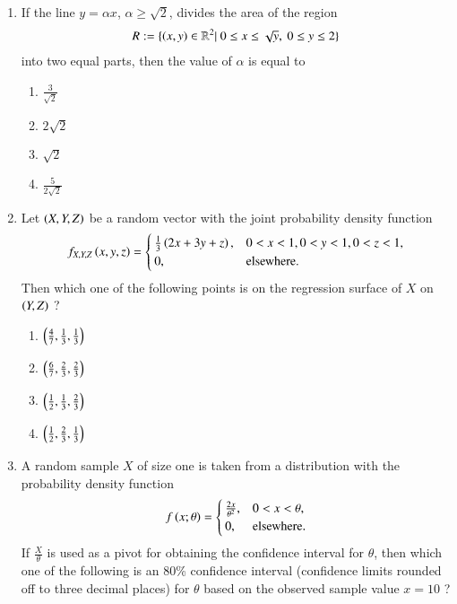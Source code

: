 \documentclass[journal]{IEEEtran}
\begin{document}
\begin{enumerate}
\item If the line $y = \alpha x$, $\alpha \geq \sqrt{2}$, divides the area of the region 
\begin{align*}
    R:= \{\left(x,y\right) \in \mathbb{R}^2|\ 0 \leq x \leq \sqrt{y},\ 0 \leq y \leq 2\}
\end{align*}
into two equal parts, then the value of $\alpha$ is equal to
\begin{enumerate}
    \item $\frac{3}{\sqrt{2}}$
    \item $2\sqrt{2}$
    \item $\sqrt{2}$
    \item $\frac{5}{2\sqrt{2}}$ \\
\end{enumerate}
\item Let $\left(X, Y, Z\right)$ be a random vector with the joint probability density function 
\begin{align*}
    f_{X, Y, Z}\left(x, y, z\right) = \begin{cases}
        \frac{1}{3}\left(2x + 3y + z\right), & 0 < x < 1,0 < y < 1,0 < z < 1, \\
        0, & \text{elsewhere}.
    \end{cases}
\end{align*}
Then which one of the following points is on the regression surface of $X$ on $\left(Y, Z\right)$ ?
\begin{enumerate}
    \item $\left(\frac{4}{7}, \frac{1}{3}, \frac{1}{3}\right)$
    \item $\left(\frac{6}{7}, \frac{2}{3}, \frac{2}{3}\right)$
    \item $\left(\frac{1}{2}, \frac{1}{3}, \frac{2}{3}\right)$
    \item $\left(\frac{1}{2}, \frac{2}{3}, \frac{1}{3}\right)$ \\
\end{enumerate}
\item A random sample $X$ of size one is taken from a distribution with the probability density function 
\begin{align*}
    f\left(x; \theta\right) = \begin{cases}
        \frac{2x}{\theta^2}, & 0 < x < \theta, \\
        0, & \text{elsewhere}.
    \end{cases}
\end{align*}
If $\frac{X}{\theta}$ is used as a pivot for obtaining the confidence interval for $\theta$, then which one of the following is an 80\% confidence interval (confidence limits rounded off to three decimal places) for $\theta$ based on the observed sample value $x = 10$ ? 

\end{enumerate}
\end{document}
